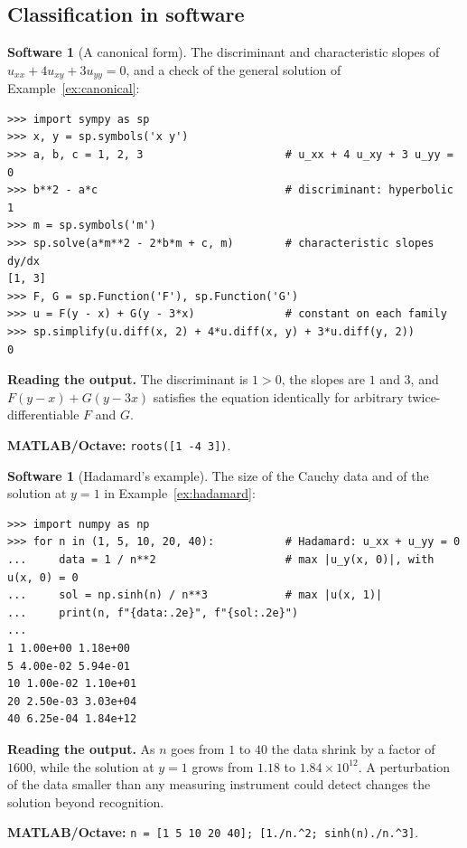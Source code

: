 \documentclass[11pt,a4paper]{article}
\numberwithin{equation}{section}
\theoremstyle{definition}
\newtheorem{software}[thm]{Software}
\begin{document}
\subsection{Classification in software}
\label{ssec:software3}

\begin{software}[A canonical form]
\label{sw:canonical}
The discriminant and characteristic slopes of $u_{xx} + 4u_{xy} + 3u_{yy} = 0$, and a check of the general solution of Example~\ref{ex:canonical}:
{\small\begin{verbatim}
>>> import sympy as sp
>>> x, y = sp.symbols('x y')
>>> a, b, c = 1, 2, 3                      # u_xx + 4 u_xy + 3 u_yy = 0
>>> b**2 - a*c                             # discriminant: hyperbolic
1
>>> m = sp.symbols('m')
>>> sp.solve(a*m**2 - 2*b*m + c, m)        # characteristic slopes dy/dx
[1, 3]
>>> F, G = sp.Function('F'), sp.Function('G')
>>> u = F(y - x) + G(y - 3*x)              # constant on each family
>>> sp.simplify(u.diff(x, 2) + 4*u.diff(x, y) + 3*u.diff(y, 2))
0
\end{verbatim}}
\textbf{Reading the output.} The discriminant is $1 > 0$, the slopes are $1$ and $3$, and $F(y - x) + G(y - 3x)$ satisfies the equation identically for arbitrary twice-differentiable $F$ and $G$.

\textbf{MATLAB/Octave:} \texttt{roots([1 -4 3])}.
\end{software}

\begin{software}[Hadamard's example]
\label{sw:hadamard}
The size of the Cauchy data and of the solution at $y = 1$ in Example~\ref{ex:hadamard}:
{\small\begin{verbatim}
>>> import numpy as np
>>> for n in (1, 5, 10, 20, 40):           # Hadamard: u_xx + u_yy = 0
...     data = 1 / n**2                    # max |u_y(x, 0)|, with u(x, 0) = 0
...     sol = np.sinh(n) / n**3            # max |u(x, 1)|
...     print(n, f"{data:.2e}", f"{sol:.2e}")
...
1 1.00e+00 1.18e+00
5 4.00e-02 5.94e-01
10 1.00e-02 1.10e+01
20 2.50e-03 3.03e+04
40 6.25e-04 1.84e+12
\end{verbatim}}
\textbf{Reading the output.} As $n$ goes from $1$ to $40$ the data shrink by a factor of $1600$, while the solution at $y = 1$ grows from $1.18$ to $1.84 \times 10^{12}$. A perturbation of the data smaller than any measuring instrument could detect changes the solution beyond recognition.

\textbf{MATLAB/Octave:} \texttt{n = [1 5 10 20 40]; [1./n.\^{}2; sinh(n)./n.\^{}3]}.
\end{software}
\end{document}
